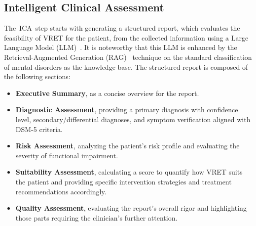 \documentclass[]{interact}
\newcommand{\stepa}{Intelligent Clinical Assessment}
\newcommand{\stepas}{ICA}
\begin{document}
\subsection{\stepa}
The~\stepas~step starts with generating a structured report, which evaluates the feasibility of VRET for the patient, from the collected information using a Large Language Model (LLM)~\cite{stade2024large}. It is noteworthy that this LLM is enhanced by the Retrieval-Augmented Generation (RAG)~\cite{lewis2020retrieval} technique on the standard classification of mental disorders as the knowledge base.
The structured report is composed of the following sections: 
\begin{itemize}
    \item \textbf{Executive Summary}, as a concise overview for the report.
    \item \textbf{Diagnostic Assessment}, providing a primary diagnosis with confidence level, secondary/differential diagnoses, and symptom verification aligned with DSM-5 criteria.
    \item \textbf{Risk Assessment}, analyzing the patient's risk profile and evaluating the severity of functional impairment.
    \item \textbf{Suitability Assessment}, calculating a score to quantify how VRET suits the patient and providing specific intervention strategies and treatment recommendations accordingly.
    \item \textbf{Quality Assessment}, evaluating the report's overall rigor and highlighting those parts requiring the clinician's further attention.
\end{itemize}
\end{document}
